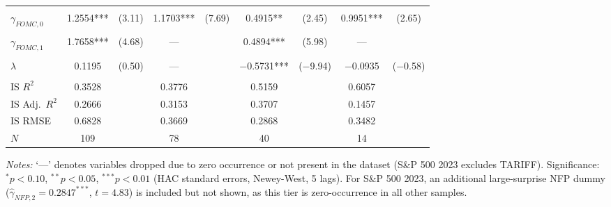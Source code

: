\documentclass[12pt,a4paper]{report}
\begin{document}
\begin{table}[H]
\begin{threeparttable}
{\begin{tabular}{lcccccccc}
                        & & & & & & & & \\
$\gamma_{FOMC,0}$       & 1.2554*** & (3.11) & 1.1703*** & (7.69) & 0.4915** & (2.45) & 0.9951*** & (2.65) \\
                        & & & & & & & & \\
$\gamma_{FOMC,1}$       & 1.7658*** & (4.68) & --- & & 0.4894*** & (5.98) & --- & \\
                        & & & & & & & & \\
$\lambda$               & 0.1195 & (0.50) & --- & & $-$0.5731*** & ($-$9.94) & $-$0.0935 & ($-$0.58) \\
                        & & & & & & & & \\
\midrule
IS $R^2$       & 0.3528 & & 0.3776 & & 0.5159 & & 0.6057 & \\
IS Adj.\ $R^2$ & 0.2666 & & 0.3153 & & 0.3707 & & 0.1457 & \\
IS RMSE        & 0.6828 & & 0.3669 & & 0.2868 & & 0.3482 & \\
$N$            & 109 & & 78 & & 40 & & 14 & \\
\bottomrule
\end{tabular}
}
\begin{tablenotes}[flushleft]
\footnotesize
\item \textit{Notes:} `---' denotes variables dropped due to zero occurrence or not present in the dataset (S\&P 500 2023 excludes TARIFF). Significance: $^{*}p<0.10$, $^{**}p<0.05$, $^{***}p<0.01$ (HAC standard errors, Newey-West, 5 lags). For S\&P 500 2023, an additional large-surprise NFP dummy ($\hat{\gamma}_{NFP,2} = 0.2847^{***}$, $t = 4.83$) is included but not shown, as this tier is zero-occurrence in all other samples.
\end{tablenotes}
\end{threeparttable}
\end{table}
\end{document}
